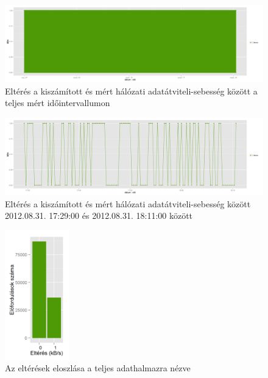 \documentclass[a4paper,10pt,titlepage]{article}
\begin{document}
\begin{figure}[h!]
\centering
\includegraphics[width=1.00\textwidth]{figures/net_transmitted_average_diff-20120826230140-20120924083120.png}
\caption{ Eltérés a kiszámított és mért hálózati adatátviteli-sebesség között a teljes mért időintervallumon \label{fig:net_transmitted_average_diff-01}}
\end{figure}

\begin{figure}[h!]
\centering
\includegraphics[width=1.00\textwidth]{figures/net_transmitted_average_diff-20120831172900-20120831181100.png}
\caption{ Eltérés a kiszámított és mért hálózati adatátviteli-sebesség között 2012.08.31. 17:29:00 és 2012.08.31. 18:11:00 között \label{fig:net_transmitted_average_diff-02}}
\end{figure}

\begin{figure}[h!]
\centering
\includegraphics[width=0.25\textwidth]{figures/net_transmitted_average_diff-dist-20120826230140-20120924083120.png}
\caption{ Az eltérések eloszlása a teljes adathalmazra nézve \label{fig:net_transmitted_average_diff-dist}}
\end{figure}
\end{document}
